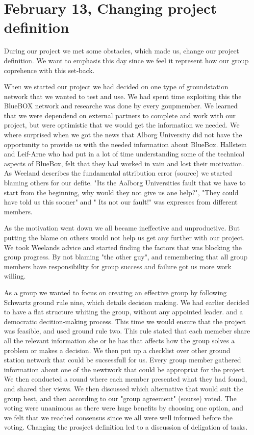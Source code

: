 \section{February 13, Changing project definition}

During our project we met some obstacles, which made us, change our project definition. We want to emphasis this day since we feel it represent how our group coprehence with this set-back.

When we started our project we had decided on one type of groundstation network that we wanted to test and use. We had spent time exploiting this the BlueBOX network and researche was done by every goupmember. We learned that we were dependend on external partners to complete and work with our project, but were optimistic that we would get the information we needed. We where surprised when we got the news that Alborg University did not have the opportunity to provide us with the needed information about BlueBox. Hallstein and Leif-Arne who had put in a lot of time understanding some of the technical aspects of BlueBox, felt that they had worked in vain and lost their motivation. As Weeland describes the fundamental attribution error (source) we started blaming others for our defite. "Its the Aalborg Universities fault that we have to start from the beginning, why would they not give us ane help?", "They could have told us this sooner" and " Its not our fault!" was expresses from different members. 

As the motivation went down we all became ineffective and unproductive. But putting the blame on others would not help us get any further with our project. We took Weelands advice and started finding the factors that was blocking the group progress. By not blaming "the other guy", and remembering that all group members have responsibility for group success and failure got us more work willing. 

As a group we wanted to focus on creating an effective group by following Schwartz ground rule nine, which details decision making. We had earlier decided to have a flat structure whiting the group, without any appointed leader. and a democratic decition-making process. This time we would ensure that the project was feasible, and used ground rule two. This rule stated that each memeber share all the relevant information she or he has that affects how the group solves a problem or makes a decision. We then put up a checklist over other ground station network that could be sucsessfull for us. Every group member gathered information about one of the newtwork that could be appropriat for the project. We then conducted a round where each member presented what they had found, and shared ther views. We then discussed which alternative that would suit the group best, and then according to our "group agreement" (sourse) voted. The voting were unanimous as there were huge benefits by choosing one option, and we felt that we reached consensus since we all were well informed before the voting. Changing the prosject definition led to a discussion of deligation of tasks. 

